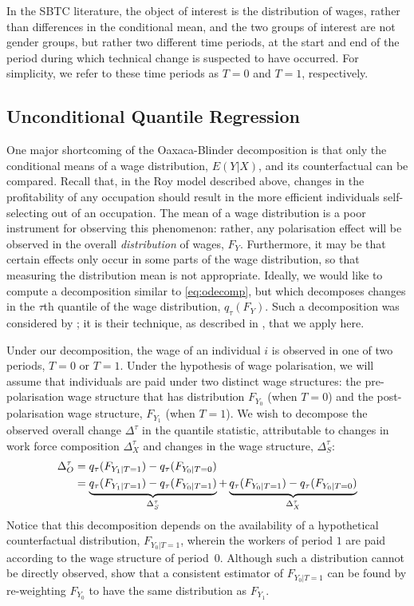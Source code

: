 In the SBTC literature, the object of interest is the distribution of wages, rather than differences in the conditional mean, and the two groups of interest are not gender groups, but rather two different time periods, at the start and end of the period during which technical change is suspected to have occurred. For simplicity, we refer to these time periods as $T=0$ and $T=1$, respectively.

\subsection{Unconditional Quantile Regression}

One major shortcoming of the Oaxaca-Blinder decomposition is that only the conditional means of a wage distribution, $E(Y|X)$, and its counterfactual can be compared. Recall that, in the Roy model described above, changes in the profitability of any occupation should result in the more efficient individuals self-selecting out of an occupation. The mean of a wage distribution is a poor instrument for observing this phenomenon: rather, any polarisation effect will be observed in the overall {\em distribution} of wages, $F_Y$. Furthermore, it may be that certain effects only occur in some parts of the wage distribution, so that measuring the distribution mean is not appropriate. Ideally, we would like to compute a decomposition similar to \eqref{eq:odecomp}, but which decomposes changes in the $\tau$th quantile of the wage distribution, $q_\tau(F_Y)$. Such a decomposition was considered by \citet{Firpo2011}; it is their technique, as described in \citet{Firpo2009}, that we apply here.

Under our decomposition, the wage of an individual $i$ is observed in one of two periods, $T=0$ or $T=1$. Under the hypothesis of wage polarisation, we will assume that individuals are paid under two distinct wage structures: the pre-polarisation wage structure that has distribution $F_{Y_0}$ (when $T=0$) and the post-polarisation wage structure, $F_{Y_1}$ (when $T=1$). We wish to decompose the observed overall change $\Delta^\tau$ in the quantile statistic, attributable to changes in work force composition $\Delta^\tau_X$ and changes in the wage structure, $\Delta^\tau_S$:
\begin{align}
  \Delta^\tau_O &= q_\tau(F_{Y_1|T=1}) - q_\tau(F_{Y_0|T=0}) \notag \\
  &= \underbrace{q_\tau(F_{Y_1|T=1}) -  q_\tau(F_{Y_0|T=1})}_{\Delta^\tau_S} + \underbrace{q_\tau(F_{Y_0|T=1}) - q_\tau(F_{Y_0|T=0})}_{\Delta^\tau_X} \label{eq:decomp}
\end{align}Notice that this decomposition depends on the availability of a hypothetical counterfactual distribution, $F_{Y_0|T=1}$, wherein the workers of period $1$ are paid according to the wage structure of period~$0$. Although such a distribution cannot be directly observed, \citet{Firpo2011} show that a consistent estimator of $F_{Y_0|T=1}$ can be found by re-weighting $F_{Y_0}$ to have the same distribution as $F_{Y_1}$.

